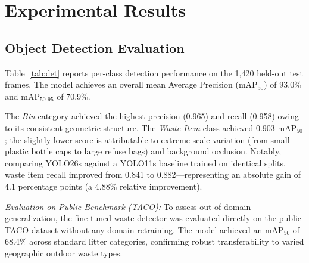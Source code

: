 \documentclass[conference]{IEEEtran}
\begin{document}
\section{Experimental Results}
\label{sec:eval}

\subsection{Object Detection Evaluation}

Table~\ref{tab:det} reports per-class detection performance on the 1,420 held-out test frames. The model achieves an overall mean Average Precision ($\text{mAP}_{50}$) of 93.0\% and $\text{mAP}_{50\text{-}95}$ of 70.9\%.

\begin{table}[!t]
\centering
\caption{Per-Class Object Detection Performance on Held-Out Test Set}
\label{tab:det}
\end{table}

The \textit{Bin} category achieved the highest precision (0.965) and recall (0.958) owing to its consistent geometric structure. The \textit{Waste Item} class achieved 0.903 $\text{mAP}_{50}$; the slightly lower score is attributable to extreme scale variation (from small plastic bottle caps to large refuse bags) and background occlusion. Notably, comparing YOLO26s against a YOLO11s baseline trained on identical splits, waste item recall improved from 0.841 to 0.882---representing an absolute gain of 4.1 percentage points (a 4.88\% relative improvement).

\textit{Evaluation on Public Benchmark (TACO):} To assess out-of-domain generalization, the fine-tuned waste detector was evaluated directly on the public TACO dataset \cite{b21} without any domain retraining. The model achieved an $\text{mAP}_{50}$ of 68.4\% across standard litter categories, confirming robust transferability to varied geographic outdoor waste types.
\end{document}
